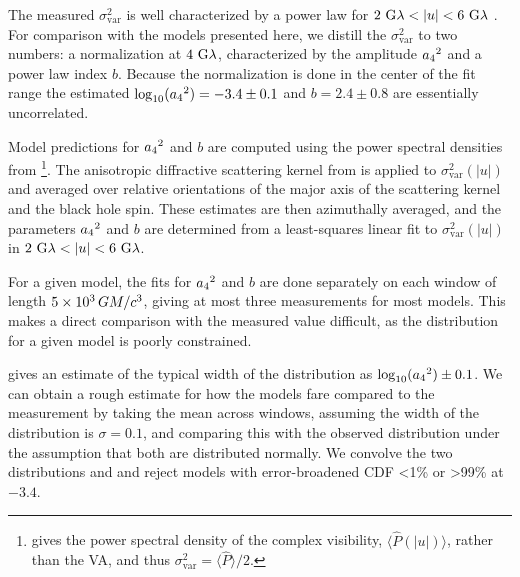 The measured $\sigma_\text{var}^2$ is well characterized by a power law for $2~{\rm G}\lambda < |u| < 6~{\rm G}\lambda$ \citep{Georgiev_2022}.
For comparison with the models presented here, we distill the $\sigma_{\text{var}}^2$ to two numbers: a normalization at $4~{\rm G}\lambda$, characterized by the amplitude ${a_4}^2$ and a power law index $b$.
Because the normalization is done in the center of the fit range the estimated $\log_{10}({a_4}^2) = -3.4 \pm 0.1$ and $b=2.4\pm0.8$ are essentially uncorrelated.

Model predictions for ${a_4}^2$ and $b$ are computed using the power spectral densities from \citet{Georgiev_2022}\footnote{\citet{Georgiev_2022} gives the power spectral density of the complex visibility, $\langle\hat{P}(|u|)\rangle$, rather than the VA, and thus $\sigma_\text{var}^2=\langle \hat{P}\rangle/2$.}.
The anisotropic diffractive scattering kernel from \citet{Johnson_2018} is applied to $\sigma_\text{var}^2(|u|)$ and averaged over relative orientations of the major axis of the scattering kernel and the black hole spin.
These estimates are then azimuthally averaged, and the parameters ${a_4}^2$ and $b$ are determined from a least-squares linear fit to $\sigma_\text{var}^2(|u|)$ in $2~{\rm G}\lambda < |u| < 6~{\rm G}\lambda$.

For a given model, the fits for ${a_4}^2$ and $b$ are done separately on each window of length $5 \times 10^3\,GM/c^3$, giving at most three measurements for most models.
This makes a direct comparison with the measured value difficult, as the distribution for a given model is poorly constrained.

\citet{Georgiev_2022} gives an estimate of the typical width of the distribution as $\log_{10}({a_4}^2) \pm 0.1$.
We can obtain a rough estimate for how the models fare compared to the measurement by taking the mean across windows, assuming the width of the distribution is $\sigma = 0.1$, and comparing this with the observed distribution under the assumption that both are distributed normally.
We convolve the two distributions and and reject models with error-broadened CDF <1\% or >99\% at $-3.4$.
